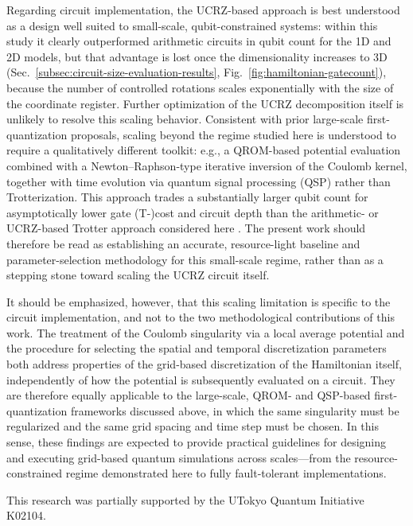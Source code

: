 \documentclass[aip, adv, amsmath, amssymb, reprint]{revtex4-1}
\begin{document}
Regarding circuit implementation, the UCRZ-based approach is best
understood as a design well suited to small-scale, qubit-constrained
systems: within this study it clearly outperformed arithmetic circuits in qubit
count for the 1D and 2D models, but that advantage is lost once the
dimensionality increases to 3D
(Sec.~\ref{subsec:circuit-size-evaluation-results}, Fig.~\ref{fig:hamiltonian-gatecount}),
because the number of controlled rotations scales exponentially with the
size of the coordinate register. Further optimization of the UCRZ
decomposition itself is unlikely to resolve this scaling behavior.
Consistent with prior large-scale first-quantization proposals, scaling
beyond the regime studied here is understood to require a
qualitatively different toolkit: e.g., a QROM-based potential evaluation
combined with a Newton--Raphson-type iterative inversion of the Coulomb
kernel, together with time evolution via quantum signal processing (QSP)
rather than Trotterization. This approach trades a substantially larger
qubit count for asymptotically lower gate (T-)cost and circuit depth than
the arithmetic- or UCRZ-based Trotter approach considered here
\cite{YuanSu.PRXQuantum.2.040332, eklund2026.arXiv2603.19007}. The present
work should therefore be read as establishing an accurate, resource-light
baseline and parameter-selection methodology for this small-scale regime,
rather than as a stepping stone toward scaling the UCRZ circuit itself.

It should be emphasized, however, that this scaling limitation is specific
to the circuit implementation, and not to the two methodological
contributions of this work. The treatment of the Coulomb singularity via
a local average potential and the procedure for selecting the spatial and
temporal discretization parameters both address properties of the
grid-based discretization of the Hamiltonian itself, independently of how
the potential is subsequently evaluated on a circuit. They are therefore
equally applicable to the large-scale, QROM- and QSP-based
first-quantization frameworks discussed above, in which the same
singularity must be regularized and the same grid spacing and time step
must be chosen. In this sense, these findings are expected to provide
practical guidelines for designing and executing grid-based quantum
simulations across scales---from the resource-constrained regime
demonstrated here to fully fault-tolerant implementations.

\begin{acknowledgments}
This research was partially supported by the UTokyo Quantum Initiative K02104.
\end{acknowledgments}
\end{document}
